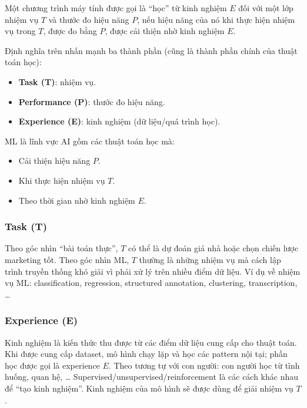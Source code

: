 \begin{dinhnghia}[title={Định nghĩa (Tom Mitchell)}]
Một chương trình máy tính được gọi là “học” từ kinh nghiệm \(E\) đối với một lớp nhiệm vụ \(T\) và thước đo hiệu năng \(P\),
nếu hiệu năng của nó khi thực hiện nhiệm vụ trong \(T\), được đo bằng \(P\), được cải thiện nhờ kinh nghiệm \(E\).
\end{dinhnghia}

\begin{ynghia}[title={Ba thành phần của bài toán học}]
Định nghĩa trên nhấn mạnh ba thành phần (cũng là thành phần chính của thuật toán học):
\begin{itemize}
  \item \textbf{Task (T)}: nhiệm vụ.
  \item \textbf{Performance (P)}: thước đo hiệu năng.
  \item \textbf{Experience (E)}: kinh nghiệm (dữ liệu/quá trình học).
\end{itemize}
\end{ynghia}

\begin{phuongphap}[title={Cách diễn giải ngắn}]
ML là lĩnh vực AI gồm các thuật toán học mà:
\begin{itemize}
  \item Cải thiện hiệu năng \(P\).
  \item Khi thực hiện nhiệm vụ \(T\).
  \item Theo thời gian nhờ kinh nghiệm \(E\).
\end{itemize}
\end{phuongphap}

\subsubsection{Task (T)}
\begin{ynghia}[title={Task theo góc nhìn ML}]
Theo góc nhìn “bài toán thực”, \(T\) có thể là dự đoán giá nhà hoặc chọn chiến lược marketing tốt.
Theo góc nhìn ML, \(T\) thường là những nhiệm vụ mà cách lập trình truyền thống khó giải vì phải xử lý trên nhiều điểm dữ liệu.
Ví dụ về nhiệm vụ ML: classification, regression, structured annotation, clustering, transcription, \ldots
\end{ynghia}

\subsubsection{Experience (E)}
\begin{ynghia}[title={Kinh nghiệm là gì?}]
Kinh nghiệm là kiến thức thu được từ các điểm dữ liệu cung cấp cho thuật toán.
Khi được cung cấp dataset, mô hình chạy lặp và học các pattern nội tại; phần học được gọi là experience \(E\).
Theo tương tự với con người: con người học từ tình huống, quan hệ, \ldots
Supervised/unsupervised/reinforcement là các cách khác nhau để “tạo kinh nghiệm”.
Kinh nghiệm của mô hình sẽ được dùng để giải nhiệm vụ \(T\).
\end{ynghia}

